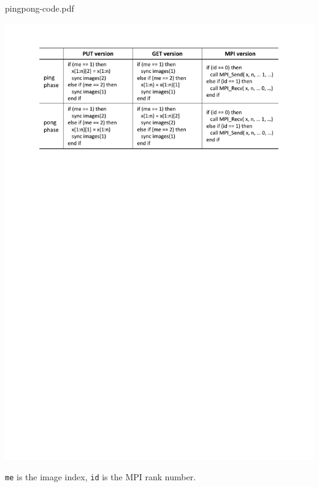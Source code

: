 \begin{table}[bht]
  \begin{center}
    \caption{pingpong-code.pdf}\label{tab:pingpong-code}
    \mbox{\includegraphics[trim=24mm 211mm 24mm 16mm, scale=0.7,clip]{figs/pingpong-code-r2.pdf}}
    \begin{flushright}
      {\tt me} is the image index, {\tt id} is the MPI rank number.
    \end{flushright}
  \end{center}
\end{table}
